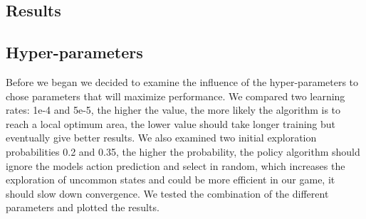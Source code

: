 \documentclass[leqno]{article}
\begin{document}
\begin{multicols}{2}
\section{Results}
\subsection{Hyper-parameters}
Before we began we decided to examine the influence of the hyper-parameters to chose parameters that will maximize performance. We compared two learning rates: 1e-4 and 5e-5, the higher the value, the more likely the algorithm is to reach a local optimum area, the lower value should take longer training but eventually give better results. We also examined two initial exploration probabilities 0.2 and 0.35, the higher the probability, the policy algorithm should ignore the models action prediction and select in random, which increases the exploration of uncommon states and could be more efficient in our game, it should slow down convergence. We tested the combination of the different parameters and plotted the results.


\end{multicols}
\end{document}

